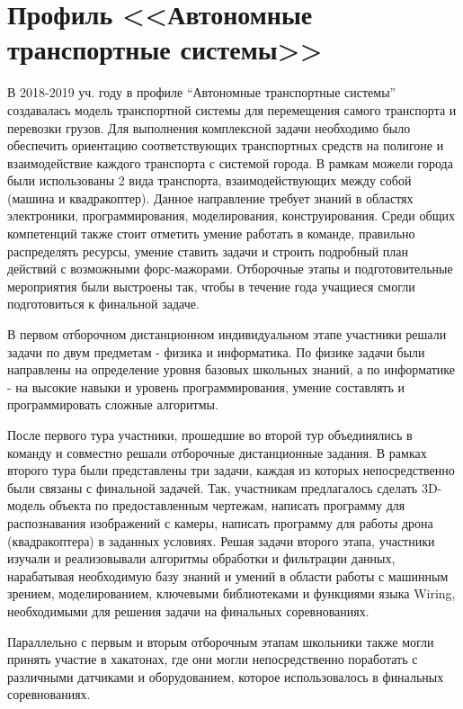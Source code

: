

\section*{Профиль <<Автономные транспортные системы>>}

В 2018-2019 уч. году в профиле “Автономные транспортные системы” создавалась модель транспортной системы для перемещения самого транспорта и перевозки грузов. Для выполнения комплексной задачи необходимо было обеспечить ориентацию соответствующих транспортных средств на полигоне и взаимодействие каждого транспорта с системой города. В рамкам можели города были использованы 2 вида транспорта, взаимодействующих между собой (машина и квадракоптер). Данное направление требует знаний в областях электроники, программирования, моделирования, конструирования. Среди общих компетенций также стоит отметить умение работать в команде, правильно распределять ресурсы, умение ставить задачи и строить подробный план действий с возможными форс-мажорами. Отборочные этапы и подготовительные мероприятия были выстроены так, чтобы в течение года учащиеся смогли подготовиться к финальной задаче. 

В первом отборочном дистанционном индивидуальном этапе участники решали задачи по двум предметам - физика и информатика. По физике задачи были направлены на определение уровня базовых школьных знаний, а по информатике - на высокие навыки и уровень программирования, умение составлять и программировать сложные алгоритмы.

После первого тура участники, прошедшие во второй тур объединялись в команду и совместно решали отборочные дистанционные задания. В рамках второго тура были представлены три задачи, каждая из которых непосредственно были связаны с финальной задачей. Так, участникам предлагалось сделать 3D-модель объекта по предоставленным чертежам, написать программу для распознавания изображений с камеры, написать программу для работы дрона (квадракоптера) в заданных условиях. Решая задачи второго этапа, участники изучали и реализовывали алгоритмы обработки и фильтрации данных, нарабатывая необходимую базу знаний и умений в области работы с машинным зрением, моделированием, ключевыми библиотеками и функциями языка Wiring, необходимыми для решения задачи на финальных соревнованиях.

Параллельно с первым и вторым отборочным этапам школьники также могли принять участие в хакатонах, где они могли непосредственно поработать с различными датчиками и оборудованием, которое использовалось в финальных соревнованиях.

